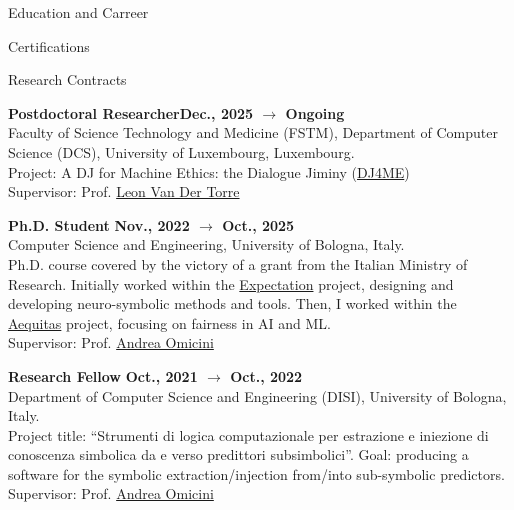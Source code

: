 \documentclass{resume} %
\begin{document}
\begin{rSection}{Education and Carreer}
\begin{rSubsection2}{Certifications}
        \end{rSubsection2}


        \begin{rSubsection2}{Research Contracts}

            \item\textbf{Postdoctoral Researcher}\hfill \textbf{Dec., 2025 $\rightarrow$ Ongoing}
            \\Faculty of Science Technology and Medicine (FSTM), Department of Computer Science (DCS), University of Luxembourg, Luxembourg.
            \\Project: A DJ for Machine Ethics: the Dialogue Jiminy (\href{https://icr.uni.lu/dj4me/index.html}{DJ4ME})
            \\Supervisor: Prof. \href{mailto:leon.vandertorre@uni.lu}{Leon Van Der Torre}

            \item\textbf{ Ph.D. Student }\hfill \textbf{Nov., 2022 $\rightarrow$ Oct., 2025}
            \\Computer Science and Engineering, University of Bologna, Italy.
            \\Ph.D. course covered by the victory of a grant from the Italian Ministry of Research.
            Initially worked within the \href{https://expectation.ehealth.hevs.ch/posts/home/}{Expectation} project, designing and developing neuro-symbolic methods and tools.
            Then, I worked within the \href{https://www.aequitas-project.eu/}{Aequitas} project, focusing on fairness in AI and ML.
            \\Supervisor: Prof. \href{mailto:andrea.omicini@unibo.it}{Andrea Omicini}
            \item\textbf{ Research Fellow }\hfill \textbf{Oct., 2021 $\rightarrow$ Oct., 2022}
            \\Department of Computer Science and Engineering (DISI), University of Bologna, Italy.
            \\Project title: ``Strumenti di logica computazionale per estrazione e iniezione di conoscenza simbolica da e verso predittori subsimbolici''.
            Goal: producing a software for the symbolic extraction/injection from/into sub-symbolic predictors.
            \\Supervisor: Prof. \href{mailto:andrea.omicini@unibo.it}{Andrea Omicini}


\end{rSubsection2}
\end{rSection}
\end{document}
